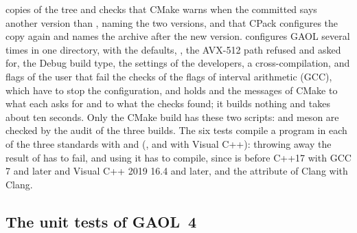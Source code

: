 copies of the tree and checks that CMake warns when the committed
 says another version than , naming the
two versions, and that CPack configures the copy again and names the archive
after the new version.  configures GAOL
several times in one directory, with the defaults, ,
the AVX-512 path refused and asked for, the Debug build type, the settings
of the developers, a cross-compilation, and flags of the user that fail the
checks of the flags of interval arithmetic (GCC), which have to stop the
configuration, and holds
 and the messages of CMake to what each asks for
and to what the checks found; it builds nothing and takes about ten seconds.
Only the CMake build has these two scripts:  and meson are
checked by the audit of the three builds. The six tests 
compile a program in each of the three standards with
 and 
(,  and  with Visual C++):
throwing away the result of  has to fail, and using it has to
compile, since  is \code{[[nodiscard]]} before C++17
with GCC 7 and later and Visual C++ 2019 16.4 and later, and the attribute of
Clang with Clang.\newinvfive

\subsection{The unit tests of GAOL~4}


